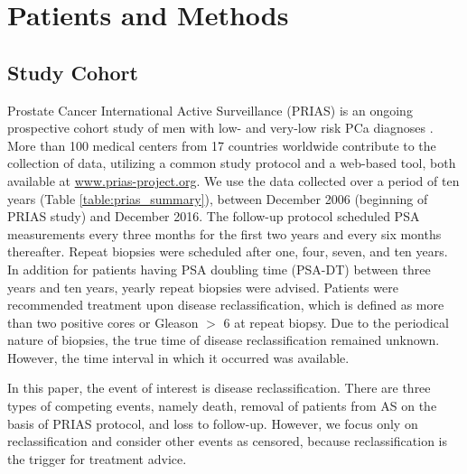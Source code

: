 \section{Patients and Methods}

\subsection{Study Cohort}
Prostate Cancer International Active Surveillance (PRIAS) is an ongoing prospective cohort study of men with low- and very-low risk PCa diagnoses \cite{bul2013active}. More than 100 medical centers from 17 countries worldwide contribute to the collection of data, utilizing a common study protocol and a web-based tool, both available at \url{www.prias-project.org}. We use the data collected over a period of ten years (Table \ref{table:prias_summary}), between December 2006 (beginning of PRIAS study) and December 2016. The follow-up protocol scheduled PSA measurements every three months for the first two years and every six months thereafter. Repeat biopsies were scheduled after one, four, seven, and ten years. In addition for patients having PSA doubling time (PSA-DT) between three years and ten years, yearly repeat biopsies were advised. Patients were recommended treatment upon disease reclassification, which is defined as more than two positive cores or Gleason $>$ 6 at repeat biopsy. Due to the periodical nature of biopsies, the true time of disease reclassification remained unknown. However, the time interval in which it occurred was available.

In this paper, the event of interest is disease reclassification. There are three types of competing events, namely death, removal of patients from AS on the basis of PRIAS protocol, and loss to follow-up. However, we focus only on reclassification and consider other events as censored, because reclassification is the trigger for treatment advice.

